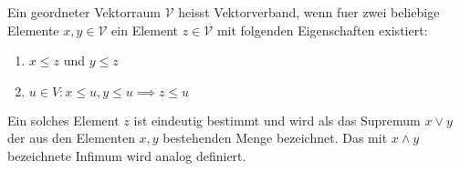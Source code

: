 Ein geordneter Vektorraum $\mathcal{V}$ heisst Vektorverband, wenn fuer zwei beliebige Elemente $x, y \in \mathcal{V}$ ein Element $z \in \mathcal{V}$ mit folgenden Eigenschaften existiert:
\begin{enumerate}
\item $x \leq z$ und $y \leq z$ 
\item $u \in V : x \leq u, y \leq u \implies z \leq u$
\end{enumerate}
Ein solches Element $z$ ist eindeutig bestimmt und wird als das Supremum $x \lor y$ der aus den Elementen $x, y$ bestehenden Menge bezeichnet.  Das mit $x \land y$ bezeichnete Infimum wird analog definiert.
